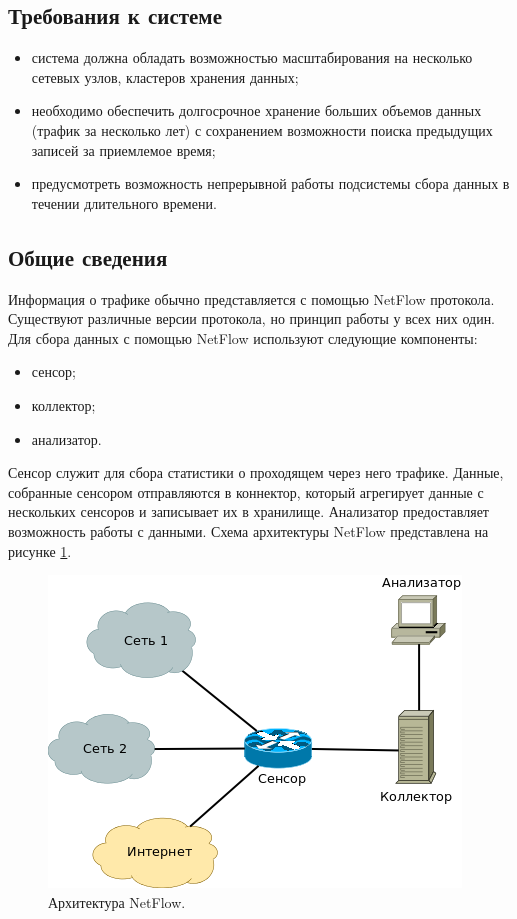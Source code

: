 \subsection{Требования к системе}
\begin{itemize}
	\item система должна обладать возможностью масштабирования на несколько сетевых узлов, кластеров хранения данных;
	\item необходимо обеспечить долгосрочное хранение больших объемов данных (трафик за несколько лет) с сохранением возможности поиска предыдущих записей
		за приемлемое время;
	\item предусмотреть возможность непрерывной работы подсистемы сбора данных в течении длительного времени.
\end{itemize}

\subsection{ Общие сведения }
Информация о трафике обычно представляется с помощью NetFlow протокола\cite{netflow}. Существуют различные версии протокола, но принцип работы у всех них один. Для сбора данных с помощью NetFlow используют следующие компоненты:
\begin{itemize}
	\item сенсор;
	\item коллектор;
	\item анализатор.
\end{itemize}
\indent \indent Сенсор служит для сбора статистики о проходящем через него трафике. Данные, собранные сенсором отправляются в коннектор, который агрегирует данные с нескольких сенсоров и записывает их в хранилище. Анализатор предоставляет возможность работы с данными. Схема архитектуры NetFlow представлена на рисунке \ref{netflow}.
\begin{figure}[H]
	\centering
	\includegraphics[scale=0.5]{netflow.png}
	\caption{Архитектура NetFlow.}
	\label{netflow}
\end{figure}

